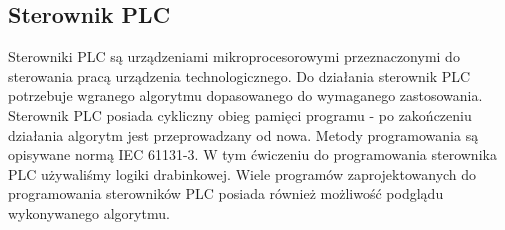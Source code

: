 \documentclass[a4paper, 12pt]{article}
\begin{document}
		\subsection{Sterownik PLC}
			Sterowniki PLC są urządzeniami mikroprocesorowymi przeznaczonymi do sterowania pracą urządzenia technologicznego. Do działania sterownik PLC potrzebuje wgranego algorytmu dopasowanego do wymaganego zastosowania. Sterownik PLC posiada cykliczny obieg pamięci programu - po zakończeniu działania algorytm jest przeprowadzany od nowa.
			\newline 
			\newline
			Metody programowania są opisywane normą IEC 61131-3. W tym ćwiczeniu do programowania sterownika PLC używaliśmy logiki drabinkowej. Wiele programów zaprojektowanych do programowania sterowników PLC posiada również możliwość podglądu wykonywanego algorytmu.
\end{document}
